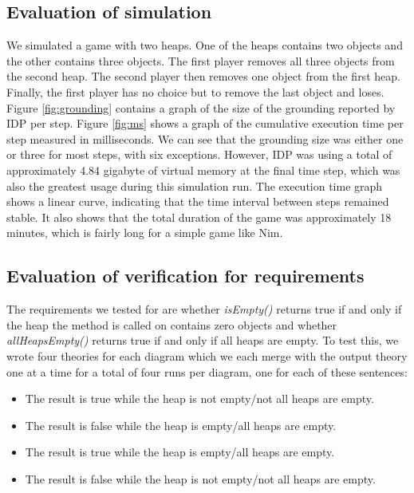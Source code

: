 \documentclass[conference]{IEEEtran}
\begin{document}
\subsection{Evaluation of simulation}

We simulated a game with two heaps. One of the heaps contains two objects and the other contains three objects. The first player removes all three objects from the second heap. The second player then removes one object from the first heap. Finally, the first player has no choice but to remove the last object and loses.
Figure \ref{fig:grounding} contains a graph of the size of the grounding reported by IDP per step. Figure \ref{fig:ms} shows a graph of the cumulative execution time per step measured in milliseconds. We can see that the grounding size was either one or three for most steps, with six exceptions. However, IDP was using a total of approximately 4.84 gigabyte of virtual memory at the final time step, which was also the greatest usage during this simulation run. The execution time graph shows a linear curve, indicating that the time interval between steps remained stable. It also shows that the total duration of the game was approximately 18 minutes, which is fairly long for a simple game like Nim.

\subsection{Evaluation of verification for requirements}

The requirements we tested for are whether \textit{isEmpty()} returns true if and only if the heap the method is called on contains zero objects and whether \textit{allHeapsEmpty()} returns true if and only if all heaps are empty. To test this, we wrote four theories for each diagram which we each merge with the output theory one at a time for a total of four runs per diagram, one for each of these sentences:

\begin{itemize}
	\item The result is true while the heap is not empty/not all heaps are empty.
	\item The result is false while the heap is empty/all heaps are empty.
	\item The result is true while the heap is empty/all heaps are empty.
	\item The result is false while the heap is not empty/not all heaps are empty.
\end{itemize}
\end{document}

